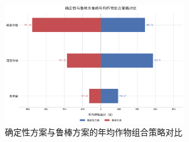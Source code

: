 \begin{figure}[htbp]
	\centering
	\includegraphics[width=0.7\textwidth]{figures/2_2.png}
	\caption{确定性方案与鲁棒方案的年均作物组合策略对比}
	\label{fig:2_2}
\end{figure}